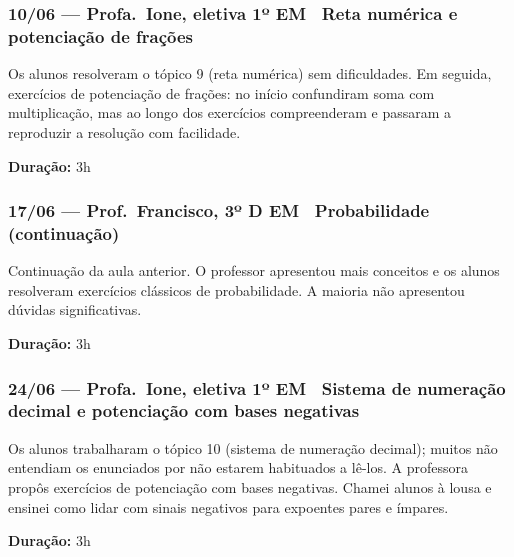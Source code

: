 \documentclass[11pt]{article}
\begin{document}
\subsubsection*{10/06 --- Profa.\ Ione, eletiva 1º EM \textbar\ Reta numérica e potenciação de frações}

Os alunos resolveram o tópico 9 (reta numérica) sem dificuldades. Em seguida, exercícios de potenciação de frações: no início confundiram soma com multiplicação, mas ao longo dos exercícios compreenderam e passaram a reproduzir a resolução com facilidade.

\textbf{Duração:} 3h

\subsubsection*{17/06 --- Prof.\ Francisco, 3º D EM \textbar\ Probabilidade (continuação)}

Continuação da aula anterior. O professor apresentou mais conceitos e os alunos resolveram exercícios clássicos de probabilidade. A maioria não apresentou dúvidas significativas.

\textbf{Duração:} 3h

\subsubsection*{24/06 --- Profa.\ Ione, eletiva 1º EM \textbar\ Sistema de numeração decimal e potenciação com bases negativas}

Os alunos trabalharam o tópico 10 (sistema de numeração decimal); muitos não entendiam os enunciados por não estarem habituados a lê-los. A professora propôs exercícios de potenciação com bases negativas. Chamei alunos à lousa e ensinei como lidar com sinais negativos para expoentes pares e ímpares.

\textbf{Duração:} 3h
\end{document}
